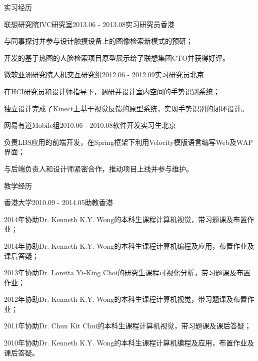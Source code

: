 \documentclass[UTF8]{cv_professional-cn} %
\begin{document}
\begin{rSection}{实习经历}

\begin{rSubsection}{联想研究院IVC研究室}{2013.06 - 2013.08}{实习研究员}{香港}
    \item 与同事探讨并参与设计触摸设备上的图像检索新模式的预研；
    \item 开发的基于热图的人脸检索项目原型展示给了联想集团CTO并获得好评。
\end{rSubsection}

\begin{rSubsection}{微软亚洲研究院人机交互研究组}{2012.06 - 2012.09}{实习研究员}{北京}
    \item 在HCI研究员和设计师指导下，调研并设计室内空间的手势识别系统；
    \item 独立设计完成了Kinect上基于视觉反馈的原型系统，实现手势识别的闭环设计。
\end{rSubsection}

\begin{rSubsection}{网易有道Mobile组}{2010.06 - 2010.08}{软件开发实习生}{北京}
    \item 负责LBS应用的前端开发，在Spring框架下利用Velocity模版语言编写Web及WAP界面；
    \item 与后端负责人和设计师紧密合作，推动项目上线并参与维护。
\end{rSubsection}

\end{rSection}



\begin{rSection}{教学经历}

\begin{rSubsection}{香港大学}{2010.09 - 2014.05}{助教}{香港}
    \item 2014年协助Dr. Kenneth K.Y. Wong的本科生课程计算机视觉，带习题课及布置作业；
    \item 2014年协助Dr. Kenneth K.Y. Wong的本科生课程计算机编程及应用，布置作业及课后答疑；
    \item 2013年协助Dr. Loretta Yi-King Choi的研究生课程可视化分析，带习题课及布置作业；
    \item 2012年协助Dr. Kenneth K.Y. Wong的本科生课程计算机视觉，带习题课及布置作业；
    \item 2011年协助Dr. Chun Kit Chui的本科生课程计算机视觉，带习题课及课后答疑；
    \item 2010年协助Dr. Kenneth K.Y. Wong的本科生课程计算机编程及应用，布置作业及课后答疑。
\end{rSubsection}

\end{rSection}
\end{document}
